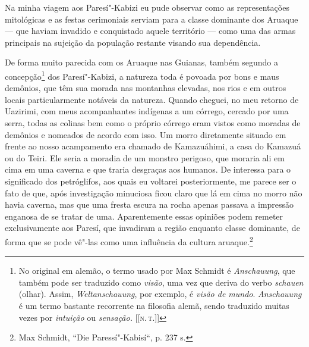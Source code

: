 Na minha viagem aos Paresí"-Kabizi eu pude observar como as
representações mitológicas e as festas cerimoniais serviam para a
classe dominante dos Aruaque --- que haviam invadido e conquistado
aquele território --- como uma das armas principais na sujeição da
população restante visando sua dependência.

De forma muito parecida com os Aruaque nas Guianas, também segundo a
concepção\footnote{No original em alemão, o termo usado por Max
  Schmidt é \emph{Anschauung}, que também pode ser traduzido como
  \emph{visão}, uma vez que deriva do verbo \emph{schauen} (olhar).
  Assim, \emph{Weltanschauung}, por exemplo, é \emph{visão de mundo}.
  \emph{Anschauung} é um termo bastante recorrente na filosofia alemã,
  sendo traduzido muitas vezes por \emph{intuição} ou \emph{sensação.}
  {[}{[}\textsc{n.\,t.}{]}{]}} dos Paresí"-Kabizi, a natureza toda é povoada por bons e maus
demônios, que têm sua morada nas montanhas elevadas, nos rios e em
outros locais particularmente notáveis da natureza. Quando cheguei, no
meu retorno de Uazirimi, com meus acompanhantes indígenas a um córrego,
cercado por uma serra, todas as colinas bem como o próprio córrego eram
vistos como moradas de demônios e nomeados de acordo com isso. Um morro
diretamente situado em frente ao nosso acampamento era chamado de
Kamazuáhimi, a casa do Kamazuá ou do Teiri. Ele seria a moradia de um
monstro perigoso, que moraria ali em cima em uma caverna e que traria
desgraças aos humanos. De interessa para o significado dos petróglifos,
aos quais eu voltarei posteriormente, me parece ser o fato de que, após
investigação minuciosa ficou claro que lá em cima no morro não havia
caverna, mas que uma fresta escura na rocha apenas passava a impressão
enganosa de se tratar de uma. Aparentemente essas opiniões podem
remeter exclusivamente aos Paresí, que invadiram a região enquanto
classe dominante, de forma que se pode vê"-las como uma influência da
cultura aruaque.\footnote{Max Schmidt, ``Die Paressí"-Kabisí``, p. 237 s.}



